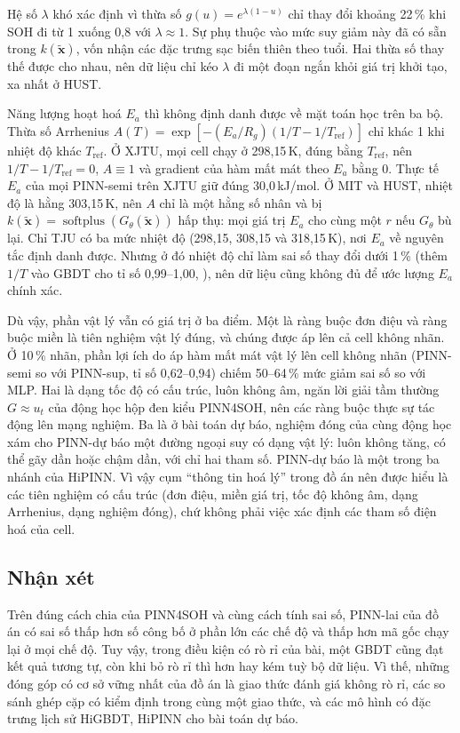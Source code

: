 Hệ số $\lambda$ khó xác định vì thừa số $g(u) = e^{\lambda(1-u)}$ chỉ thay đổi khoảng 22\,\% khi SOH đi từ 1 xuống 0,8 với $\lambda \approx 1$. Sự phụ thuộc vào mức suy giảm này đã có sẵn trong $k(\tilde{\mathbf{x}})$, vốn nhận các đặc trưng sạc biến thiên theo tuổi. Hai thừa số thay thế được cho nhau, nên dữ liệu chỉ kéo $\lambda$ đi một đoạn ngắn khỏi giá trị khởi tạo, xa nhất ở HUST.

Năng lượng hoạt hoá $E_a$ thì không định danh được về mặt toán học trên ba bộ. Thừa số Arrhenius $A(T) = \exp[-(E_a/R_g)(1/T - 1/T_\text{ref})]$ chỉ khác 1 khi nhiệt độ khác $T_\text{ref}$. Ở XJTU, mọi cell chạy ở 298{,}15\,K, đúng bằng $T_\text{ref}$, nên $1/T - 1/T_\text{ref} = 0$, $A \equiv 1$ và gradient của hàm mất mát theo $E_a$ bằng 0. Thực tế $E_a$ của mọi PINN-semi trên XJTU giữ đúng 30{,}0\,kJ/mol. Ở MIT và HUST, nhiệt độ là hằng 303{,}15\,K, nên $A$ chỉ là một hằng số nhân và bị $k(\tilde{\mathbf{x}}) = \operatorname{softplus}(G_\theta(\tilde{\mathbf{x}}))$ hấp thụ: mọi giá trị $E_a$ cho cùng một $r$ nếu $G_\theta$ bù lại. Chỉ TJU có ba mức nhiệt độ (298{,}15, 308{,}15 và 318{,}15\,K), nơi $E_a$ về nguyên tắc định danh được. Nhưng ở đó nhiệt độ chỉ làm sai số thay đổi dưới 1\,\% (thêm $1/T$ vào GBDT cho tỉ số 0{,}99--1{,}00, ), nên dữ liệu cũng không đủ để ước lượng $E_a$ chính xác.

Dù vậy, phần vật lý vẫn có giá trị ở ba điểm. Một là ràng buộc đơn điệu và ràng buộc miền là tiên nghiệm vật lý đúng, và chúng được áp lên cả cell không nhãn. Ở 10\,\% nhãn, phần lợi ích do áp hàm mất mát vật lý lên cell không nhãn (PINN-semi so với PINN-sup, tỉ số 0{,}62--0{,}94) chiếm 50--64\,\% mức giảm sai số so với MLP. Hai là dạng tốc độ có cấu trúc, luôn không âm, ngăn lời giải tầm thường $G \approx u_t$ của động học hộp đen kiểu PINN4SOH, nên các ràng buộc thực sự tác động lên mạng nghiệm. Ba là ở bài toán dự báo, nghiệm đóng của cùng động học xám cho PINN-dự báo một đường ngoại suy có dạng vật lý: luôn không tăng, có thể gãy dần hoặc chậm dần, với chỉ hai tham số. PINN-dự báo là một trong ba nhánh của HiPINN. Vì vậy cụm “thông tin hoá lý” trong đồ án nên được hiểu là các tiên nghiệm có cấu trúc (đơn điệu, miền giá trị, tốc độ không âm, dạng Arrhenius, dạng nghiệm đóng), chứ không phải việc xác định các tham số điện hoá của cell.

\subsection{Nhận xét}
Trên đúng cách chia của PINN4SOH và cùng cách tính sai số, PINN-lai của đồ án có sai số thấp hơn số công bố ở phần lớn các chế độ và thấp hơn mã gốc chạy lại ở mọi chế độ. Tuy vậy, trong điều kiện có rò rỉ của bài, một GBDT cũng đạt kết quả tương tự, còn khi bỏ rò rỉ thì hơn hay kém tuỳ bộ dữ liệu. Vì thế, những đóng góp có cơ sở vững nhất của đồ án là giao thức đánh giá không rò rỉ, các so sánh ghép cặp có kiểm định trong cùng một giao thức, và các mô hình có đặc trưng lịch sử HiGBDT, HiPINN cho bài toán dự báo.
